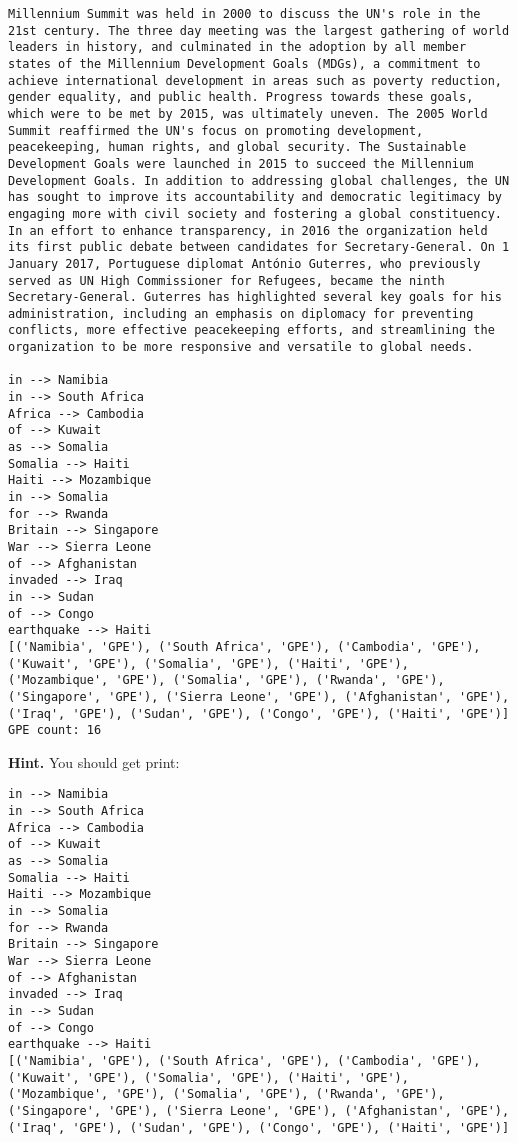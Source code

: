 \documentclass[11pt]{article}
\begin{document}
\begin{Verbatim}[commandchars=\\\{\}]
Millennium Summit was held in 2000 to discuss the UN's role in the 21st century. The three day meeting was the largest gathering of world leaders in history, and culminated in the adoption by all member states of the Millennium Development Goals (MDGs), a commitment to achieve international development in areas such as poverty reduction, gender equality, and public health. Progress towards these goals, which were to be met by 2015, was ultimately uneven. The 2005 World Summit reaffirmed the UN's focus on promoting development, peacekeeping, human rights, and global security. The Sustainable Development Goals were launched in 2015 to succeed the Millennium Development Goals. In addition to addressing global challenges, the UN has sought to improve its accountability and democratic legitimacy by engaging more with civil society and fostering a global constituency. In an effort to enhance transparency, in 2016 the organization held its first public debate between candidates for Secretary-General. On 1 January 2017, Portuguese diplomat António Guterres, who previously served as UN High Commissioner for Refugees, became the ninth Secretary-General. Guterres has highlighted several key goals for his administration, including an emphasis on diplomacy for preventing conflicts, more effective peacekeeping efforts, and streamlining the organization to be more responsive and versatile to global needs.

in --> Namibia
in --> South Africa
Africa --> Cambodia
of --> Kuwait
as --> Somalia
Somalia --> Haiti
Haiti --> Mozambique
in --> Somalia
for --> Rwanda
Britain --> Singapore
War --> Sierra Leone
of --> Afghanistan
invaded --> Iraq
in --> Sudan
of --> Congo
earthquake --> Haiti
[('Namibia', 'GPE'), ('South Africa', 'GPE'), ('Cambodia', 'GPE'), ('Kuwait', 'GPE'), ('Somalia', 'GPE'), ('Haiti', 'GPE'), ('Mozambique', 'GPE'), ('Somalia', 'GPE'), ('Rwanda', 'GPE'), ('Singapore', 'GPE'), ('Sierra Leone', 'GPE'), ('Afghanistan', 'GPE'), ('Iraq', 'GPE'), ('Sudan', 'GPE'), ('Congo', 'GPE'), ('Haiti', 'GPE')]
GPE count: 16

    \end{Verbatim}

    \textbf{Hint.} You should get print:

\begin{verbatim}
in --> Namibia
in --> South Africa
Africa --> Cambodia
of --> Kuwait
as --> Somalia
Somalia --> Haiti
Haiti --> Mozambique
in --> Somalia
for --> Rwanda
Britain --> Singapore
War --> Sierra Leone
of --> Afghanistan
invaded --> Iraq
in --> Sudan
of --> Congo
earthquake --> Haiti
[('Namibia', 'GPE'), ('South Africa', 'GPE'), ('Cambodia', 'GPE'), ('Kuwait', 'GPE'), ('Somalia', 'GPE'), ('Haiti', 'GPE'), ('Mozambique', 'GPE'), ('Somalia', 'GPE'), ('Rwanda', 'GPE'), ('Singapore', 'GPE'), ('Sierra Leone', 'GPE'), ('Afghanistan', 'GPE'), ('Iraq', 'GPE'), ('Sudan', 'GPE'), ('Congo', 'GPE'), ('Haiti', 'GPE')]
\end{verbatim}
\end{document}
